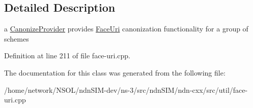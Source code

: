 \subsection{Detailed Description}
a \hyperlink{classndn_1_1util_1_1CanonizeProvider}{Canonize\+Provider} provides \hyperlink{classndn_1_1util_1_1FaceUri}{Face\+Uri} canonization functionality for a group of schemes 

Definition at line 211 of file face-\/uri.\+cpp.



The documentation for this class was generated from the following file\+:\begin{DoxyCompactItemize}
\item 
/home/network/\+N\+S\+O\+L/ndn\+S\+I\+M-\/dev/ns-\/3/src/ndn\+S\+I\+M/ndn-\/cxx/src/util/face-\/uri.\+cpp\end{DoxyCompactItemize}
